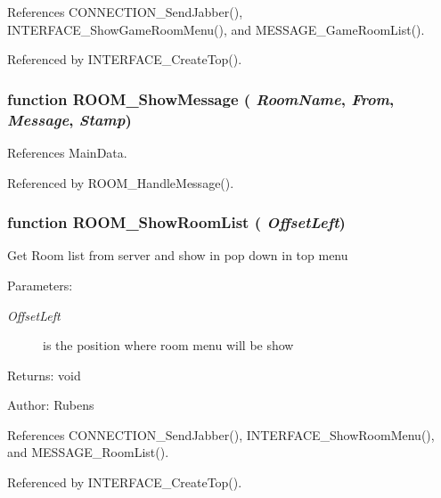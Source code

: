 References CONNECTION\_\-SendJabber(), INTERFACE\_\-ShowGameRoomMenu(), and MESSAGE\_\-GameRoomList().

Referenced by INTERFACE\_\-CreateTop().
\subsubsection{\setlength{\rightskip}{0pt plus 5cm}function ROOM\_\-ShowMessage ( {\em RoomName}, \/   {\em From}, \/   {\em Message}, \/   {\em Stamp})}\label{room_2room_8js_2f5da06839d0aeb9fc8f30ceb1009dfb}




References MainData.

Referenced by ROOM\_\-HandleMessage().
\subsubsection{\setlength{\rightskip}{0pt plus 5cm}function ROOM\_\-ShowRoomList ( {\em OffsetLeft})}\label{room_2room_8js_99678e0a267a2fa6853fe401b4b8be73}


Get Room list from server and show in pop down in top menu

\begin{Desc}
\item[Parameters:]
\begin{description}
\item[{\em OffsetLeft}]is the position where room menu will be show \end{description}
\end{Desc}
\begin{Desc}
\item[Returns:]void \end{Desc}
\begin{Desc}
\item[Author:]Rubens \end{Desc}


References CONNECTION\_\-SendJabber(), INTERFACE\_\-ShowRoomMenu(), and MESSAGE\_\-RoomList().

Referenced by INTERFACE\_\-CreateTop().
